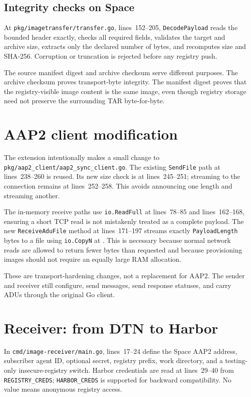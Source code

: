 \documentclass[11pt,a4paper]{article}
\newcommand{\file}[1]{\texttt{#1}}
\newcommand{\lines}[1]{lines~#1}
\begin{document}
\subsection{Integrity checks on Space}
At \file{pkg/imagetransfer/transfer.go}, \lines{152--205},
\file{DecodePayload} reads the bounded header exactly, checks all required
fields, validates the target and archive size, extracts only the declared
number of bytes, and recomputes size and SHA-256. Corruption or truncation is
rejected before any registry push.

The source manifest digest and archive checksum serve different purposes. The
archive checksum proves transport-byte integrity. The manifest digest proves
that the registry-visible image content is the same image, even though registry
storage need not preserve the surrounding TAR byte-for-byte.

\section{AAP2 client modification}
The extension intentionally makes a small change to
\file{pkg/aap2_client/aap2_sync_client.go}. The existing \file{SendFile} path
at \lines{238--260} is reused. Its new size check is at \lines{245--251};
streaming to the connection remains at \lines{252--258}. This avoids announcing
one length and streaming another.

The in-memory receive paths use \file{io.ReadFull} at \lines{78--85} and
\lines{162--168}, ensuring a short TCP read is not mistakenly treated as a
complete payload. The new \file{ReceiveAduFile} method at \lines{171--197}
streams exactly \file{PayloadLength} bytes to a file using \file{io.CopyN} at
. This is necessary because normal network reads are allowed to
return fewer bytes than requested and because provisioning images should not
require an equally large RAM allocation.

These are transport-hardening changes, not a replacement for AAP2. The sender
and receiver still configure, send messages, send response statuses, and carry
ADUs through the original Go client.

\section{Receiver: from DTN to Harbor}
In \file{cmd/image-receiver/main.go}, \lines{17--24} define the Space AAP2
address, subscriber agent ID, optional secret, registry prefix, work directory,
and a testing-only insecure-registry switch. Harbor credentials are read at
\lines{29--40} from \file{REGISTRY_CREDS}; \file{HARBOR_CREDS} is supported for
backward compatibility. No value means anonymous registry access.
\end{document}
